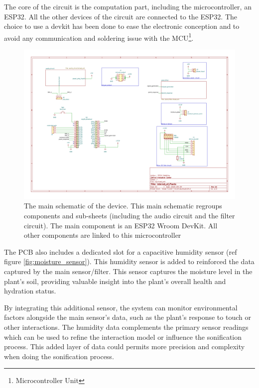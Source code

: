 The core of the circuit is the computation part, including the microcontroller, an ESP32. All the other
devices of the circuit are connected to the ESP32. The choice to use a devkit has been done
to ease the electronic conception and to avoid any communication and soldering issue with the MCU\footnote[1]{Microcontroller Unit}.

\begin{figure}[h!]
    \centering
    \includegraphics[width=\textwidth]{images/iop.pdf}
    \caption{The main schematic of the device. This main schematic regroups components and sub-sheets (including the audio circuit
        and the filter circuit). The main component is an ESP32 Wroom DevKit. All other components are linked to this
        microcontroller}
    \vspace{0.1cm}
    \label{fig:iop_schematic_main}
\end{figure}


The PCB also includes a dedicated slot for a capacitive humidity sensor (ref figure \ref{fig:moisture_sensor}). This humidity sensor is added to reinforced the data captured by the main sensor/filter. This sensor captures the moisture level in the plant's soil, providing valuable insight into the plant's overall health and hydration status.

By integrating this additional sensor, the system can monitor environmental factors alongside the main sensor's data, such as the plant's response to touch or other interactions. The humidity data complements the primary sensor readings which can be used to refine the interaction model or influence the sonification process. This added layer of data could permits more precision and complexity when doing the sonification process.

